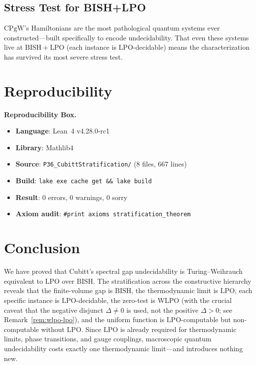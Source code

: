 \documentclass[11pt,a4paper]{article}
\theoremstyle{plain}
\theoremstyle{definition}
\newcommand{\LPO}{\ensuremath{\mathrm{LPO}}}
\newcommand{\WLPO}{\ensuremath{\mathrm{WLPO}}}
\newcommand{\BISH}{\ensuremath{\mathrm{BISH}}}
\newcommand{\CPgW}{\ensuremath{\mathrm{CPgW}}}
\begin{document}
\subsection{Stress Test for BISH+LPO}

$\CPgW$'s Hamiltonians are the most pathological quantum systems
ever constructed---built specifically to encode undecidability. That
even these systems live at $\BISH + \LPO$ (each instance is
$\LPO$-decidable) means the characterization has survived its most
severe stress test.

\section{Reproducibility}\label{sec:repro}

\begin{mdframed}[linewidth=1pt, linecolor=black, backgroundcolor=gray!5,
  innertopmargin=10pt, innerbottommargin=10pt]
\textbf{Reproducibility Box.}
\begin{itemize}[leftmargin=*]
  \item \textbf{Language}: Lean~4 v4.28.0-rc1
  \item \textbf{Library}: Mathlib4
  \item \textbf{Source}: \texttt{P36\_CubittStratification/} (8 files, 667 lines)
  \item \textbf{Build}: \texttt{lake exe cache get \&\& lake build}
  \item \textbf{Result}: 0 errors, 0 warnings, 0 sorry
  \item \textbf{Axiom audit}: \texttt{\#print axioms stratification\_theorem}
\end{itemize}
\end{mdframed}

\section{Conclusion}\label{sec:conclusion}

We have proved that Cubitt's spectral gap undecidability is
Turing--Weihrauch equivalent to $\LPO$ over $\BISH$. The
stratification across the constructive hierarchy reveals that the
finite-volume gap is $\BISH$, the thermodynamic limit is $\LPO$,
each specific instance is $\LPO$-decidable, the zero-test is
$\WLPO$ (with the crucial caveat that the negative disjunct
$\Delta \neq 0$ is used, not the positive $\Delta > 0$; see
Remark~\ref{rem:wlpo-lpo}), and the uniform function is
$\LPO$-computable but non-computable without $\LPO$. Since $\LPO$
is already required for thermodynamic limits, phase transitions,
and gauge couplings, macroscopic quantum undecidability costs
exactly one thermodynamic limit---and introduces nothing new.
\end{document}
